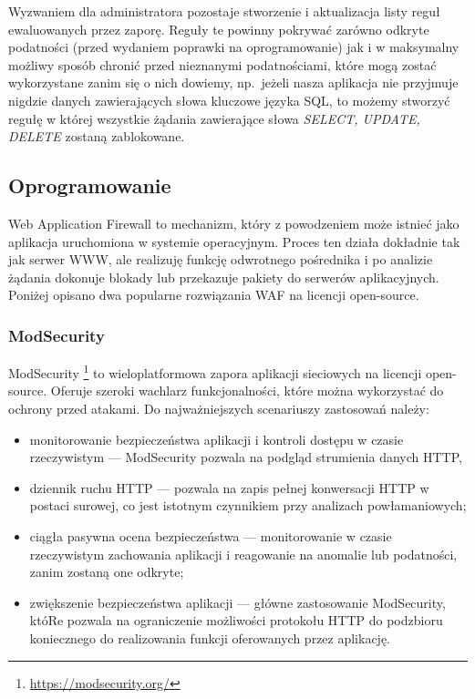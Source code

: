 \documentclass[11pt,a4paper,polish,thesis,oneside]{dcsbook}
\begin{document}
Wyzwaniem dla administratora pozostaje stworzenie i aktualizacja listy reguł ewaluowanych przez zaporę. Reguły te powinny pokrywać zarówno odkryte podatności (przed wydaniem poprawki na oprogramowanie) jak i w maksymalny możliwy sposób chronić przed nieznanymi podatnościami, które mogą zostać wykorzystane zanim się o nich dowiemy, np.~jeżeli nasza aplikacja nie przyjmuje nigdzie danych zawierających słowa kluczowe języka SQL, to możemy stworzyć regułę w której wszystkie żądania zawierające słowa \textit{SELECT, UPDATE, DELETE} zostaną zablokowane.

\subsection{Oprogramowanie}
Web Application Firewall to mechanizm, który z powodzeniem może istnieć jako aplikacja uruchomiona w systemie operacyjnym. Proces ten działa dokładnie tak jak serwer WWW, ale realizuję funkcję odwrotnego pośrednika i po analizie żądania dokonuje blokady lub przekazuje pakiety do serwerów aplikacyjnych. Poniżej opisano dwa popularne rozwiązania WAF na licencji open-source.

\subsubsection{ModSecurity}
ModSecurity \footnote{\url{https://modsecurity.org/}} to wieloplatformowa zapora aplikacji sieciowych na licencji open-source. Oferuje szeroki wachlarz funkcjonalności, które można wykorzystać do ochrony przed atakami. Do najważniejszych scenariuszy zastosowań należy:
\begin{itemize} 
\item monitorowanie bezpieczeństwa aplikacji i kontroli dostępu w czasie rzeczywistym --- ModSecurity pozwala na podgląd strumienia danych HTTP,
\item dziennik ruchu HTTP --- pozwala na zapis pełnej konwersacji HTTP w postaci surowej, co jest istotnym czynnikiem przy analizach powłamaniowych;
\item ciągła pasywna ocena bezpieczeństwa --- monitorowanie w czasie rzeczywistym zachowania aplikacji i reagowanie na anomalie lub podatności, zanim zostaną one odkryte;
\item zwiększenie bezpieczeństwa aplikacji --- główne zastosowanie ModSecurity, któRe pozwala na ograniczenie możliwości protokołu HTTP do podzbioru koniecznego do realizowania funkcji oferowanych przez aplikację.
\end{itemize}
\end{document}

